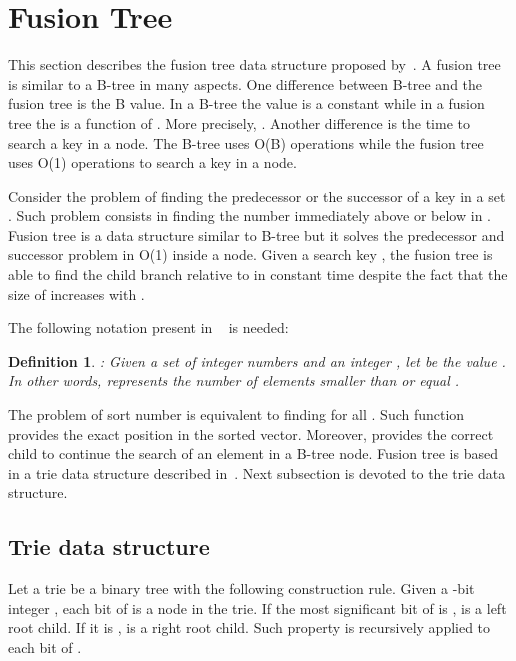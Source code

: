 \documentclass[11pt]{article}
\newtheorem{definicao}{Definition}
\begin{document}
\section{Fusion Tree}


This section describes the fusion tree data structure proposed by~\cite{fredman}. A fusion tree is similar to a B-tree in many aspects. One difference between B-tree and the fusion tree is the B value. In a B-tree the  value is a constant while in a fusion tree the  is a function of . More precisely,  . Another difference is the time to search a key in a node. The B-tree uses O(B) operations while the fusion tree uses O(1) operations to search a key  in a node.



Consider the problem of finding the predecessor or the successor of a key  in a set . Such problem consists in finding the number immediately above or below  in . Fusion tree is a data structure similar to B-tree but it solves the predecessor and successor problem in O(1) inside a node. Given a search key , the fusion tree is able to find the child branch relative to  in constant time despite the fact that the size of  increases with .





The following notation present in ~\cite{fredman} is needed:




\begin{definicao}{:}
Given a set of integer numbers  and an integer , let  be the value . In other 
words,  represents the number of elements smaller than or equal .
\end{definicao}

The problem of sort  number is equivalent to finding  for all . Such function provides the exact  position in the sorted vector. Moreover,  provides the correct child to continue the search of an element  in a B-tree node. Fusion tree is based in a trie data structure described in~\cite{ajtai}. Next subsection is devoted to the trie data structure.




\subsection{Trie data structure~\cite{ajtai}}



Let a trie be a binary tree with the following construction rule. Given a -bit integer , each bit of  is a node in the trie. If the most significant bit of  is ,  is a left root child. If it is ,  is a right root child. Such property is recursively applied to each bit of .
\end{document}

